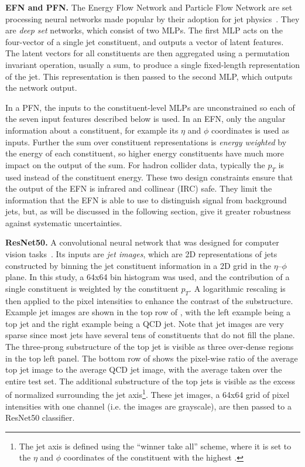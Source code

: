 \textbf{EFN and PFN.} The Energy Flow Network and Particle Flow Network are set processing neural networks made popular by their adoption for jet physics~\cite{Komiske:2018cqr}.
They are \textit{deep set} networks, which consist of two MLPs.
The first MLP acts on the four-vector of a single jet constituent, and outputs a vector of latent features.
The latent vectors for all constituents are then aggregated using a permutation invariant operation, usually a sum, to produce a single fixed-length representation of the jet.
This representation is then passed to the second MLP, which outputs the network output.

In a PFN, the inputs to the constituent-level MLPs are unconstrained so each of the seven input features described below is used.
In an EFN, only the angular information about a constituent, for example its $\eta$ and $\phi$ coordinates is used as inputs.
Further the sum over constituent representations is \textit{energy weighted} by the energy of each constituent, so higher energy constituents have much more impact on the output of the sum.
For hadron collider data, typically the $p_T$ is used instead of the constituent energy.
These two design constraints ensure that the output of the EFN is infrared and collinear (IRC) safe.
They limit the information that the EFN is able to use to distinguish signal from background jets, but, as will be discussed in the following section, give it greater robustness against systematic uncertainties.

\textbf{ResNet50.} A convolutional neural network that was designed for computer vision tasks~\cite{He:2015resnet}.
Its inputs are \textit{jet images}, which are 2D representations of jets constructed by binning the jet constituent information in a 2D grid in the $\eta$--$\phi$ plane.
In this study, a 64x64 bin histogram was used, and the contribution of a single constituent is weighted by the constituent $p_T$.
A logarithmic rescaling is then applied to the pixel intensities to enhance the contrast of the substructure.
Example jet images are shown in the top row of , with the left example being a top jet and the right example being a QCD jet.
Note that jet images are very sparse since most jets have several tens of constituents that do not fill the plane.
The three-prong substructure of the top jet is visible as three over-dense regions in the top left panel.
The bottom row of  shows the pixel-wise ratio of the average top jet image to the average QCD jet image, with the average taken over the entire test set.
The additional substructure of the top jets is visible as the excess of normalized \pt surrounding the jet axis\footnote{The jet axis is defined using the ``winner take all'' scheme, where it is set to the $\eta$ and $\phi$ coordinates of the constituent with the highest \pt.}.
These jet images, a 64x64 grid of pixel intensities with one channel (i.e. the images are grayscale), are then passed to a ResNet50 classifier.

